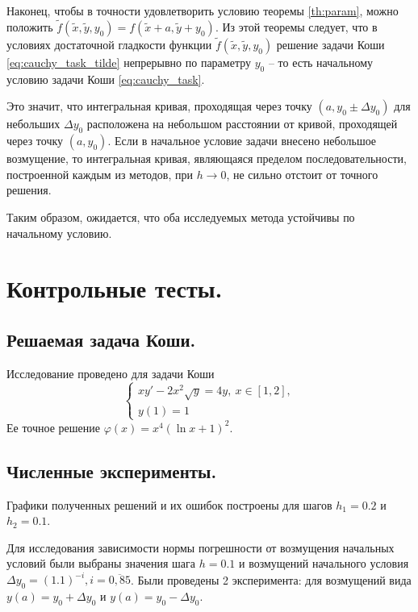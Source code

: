\documentclass[a4paper, 12pt]{article}
\theoremstyle{mythm}
\begin{document}
	Наконец, чтобы в точности удовлетворить условию теоремы \ref{th:param}, можно положить $\widetilde{f}(\widetilde{x}, \widetilde{y}, y_0) = f(\widetilde{x} + a, \widetilde{y} + y_0)$. Из этой теоремы следует, что в условиях достаточной гладкости функции $\widetilde{f}(\widetilde{x}, \widetilde{y}, y_0)$ решение задачи Коши \eqref{eq:cauchy_task_tilde} непрерывно по параметру $y_0$ -- то есть начальному условию задачи Коши \eqref{eq:cauchy_task}.
	
	Это значит, что интегральная кривая, проходящая через точку $(a, y_0 \pm \Delta y_0)$ для небольших $\Delta y_0$ расположена на небольшом расстоянии от кривой, проходящей через точку $(a, y_0)$. Если в начальное условие задачи внесено небольшое возмущение, то интегральная кривая, являющаяся пределом последовательности, построенной каждым из методов, при $h \rightarrow 0$, не сильно отстоит от точного решения.
	
	Таким образом, ожидается, что оба исследуемых метода устойчивы по начальному условию.
	
	\section{Контрольные тесты.}
	
	\subsection{Решаемая задача Коши.}
	
	Исследование проведено для задачи Коши
	\begin{equation} \label{mytask}
		\begin{cases}
			xy'-2x^2\sqrt{y}=4y,\ x\in[1,2],\\
			y(1)=1
		\end{cases}
	\end{equation}
	Ее точное решение $\varphi(x)=x^4(\ln x+1)^2$.
	
	\subsection{Численные эксперименты.}
	
	Графики полученных решений и их ошибок построены для шагов $h_1=0.2$ и $h_2=0.1$.
	
	Для исследования зависимости нормы погрешности от возмущения начальных условий были выбраны значения шага $h=0.1$ и возмущений начального условия $\Delta y_0=(1.1)^{-i}, i=\overline{0,85}$. Были проведены 2 эксперимента: для возмущений вида $y(a)=y_0+\Delta y_0$ и $y(a)=y_0-\Delta y_0$. 
	
\end{document}
